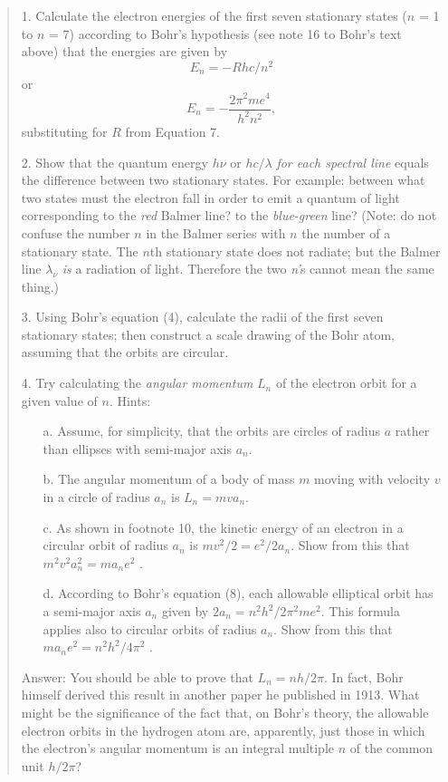 \begin{quote}
1. Calculate the electron energies of the first seven stationary states
($n$ = 1 to $n$ = 7) according to Bohr's hypothesis (see
note 16 to Bohr's text above) that the energies are given by
\begin{equation*}
E_n = - Rhc/n^2
\end{equation*}
or
\begin{equation*}\tag{8}
E_n = - \frac{2\pi^2me^4}{h^2n^2} ,
\end{equation*}
substituting for $R$ from Equation 7.

2. Show that the quantum energy $h\nu$ or $hc/\lambda$ \emph{for each
spectral line} equals the difference between two stationary states. For
example: between what two states must the electron fall in order to emit
a quantum of light corresponding to the \emph{red} Balmer line? to the
\emph{blue-green} line? (Note: do not confuse the number $n$ in the
Balmer series with $n$ the number of a stationary state. The
$n$th stationary state does not radiate; but the Balmer line
$\lambda_\nu$ \emph{is} a radiation of light. Therefore the two \emph{n'}s cannot
mean the same thing.)

3. Using Bohr's equation (4), calculate the radii of the first seven
stationary states; then construct a scale drawing of the Bohr atom,
assuming that the orbits are circular.

4. Try calculating the \emph{angular momentum} $L_n$ of the electron orbit
  for a given value of $n$. Hints:

  \begin{enumerate}
  \item[a.]
    Assume, for simplicity, that the orbits are circles of radius
    $a$ rather than ellipses with semi-major axis
    $a_n$.
  \item[b.]
    The angular momentum of a body of mass $m$ moving with velocity
    $v$ in a circle of radius $a_n$ is $L_n = mva_n .$

\item[c.]
  As shown in footnote 10, the kinetic energy of an electron in
  a circular orbit of radius $a_n$ is $mv^2/2 = e^2/2a_n$. Show from this
  that $m^2v^2a_n^2 = ma_ne^2$ .
\item[d.]
  According to Bohr's equation (8), each allowable elliptical orbit has
  a semi-major axis $a_n$ given by $2a_n = n^2h^2/2\pi^2me^2$.
  This formula applies also to circular orbits of radius
  $a_n$. Show from this that $ma_ne^2 = n^2h^2/4\pi^2$ .
\end{enumerate}

Answer: You should be able to prove that $L_n = nh/2\pi .$
In fact, Bohr himself derived this result in
another paper he published in 1913. What might be the significance of
the fact that, on Bohr's theory, the allowable electron orbits in the
hydrogen atom are, apparently, just those in which the electron's
angular momentum is an integral multiple $n$ of the common unit
$h/2\pi$?
 
\end{quote}